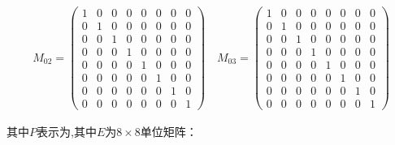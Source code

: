 \documentclass[11pt,a4paper]{article}
\begin{document}
\begin{eqnarray*}
  M_{02} = \left(\begin{array}{rrrrrrrr}
    1 & 0 & 0 & 0 & 0 & 0 & 0 & 0 \\
    0 & 1 & 0 & 0 & 0 & 0 & 0 & 0 \\
    0 & 0 & 1 & 0 & 0 & 0 & 0 & 0 \\
    0 & 0 & 0 & 1 & 0 & 0 & 0 & 0 \\
    0 & 0 & 0 & 0 & 1 & 0 & 0 & 0 \\
    0 & 0 & 0 & 0 & 0 & 1 & 0 & 0 \\
    0 & 0 & 0 & 0 & 0 & 0 & 1 & 0 \\
    0 & 0 & 0 & 0 & 0 & 0 & 0 & 1
    \end{array}\right)\quad
  M_{03} = \left(\begin{array}{rrrrrrrr}
    1 & 0 & 0 & 0 & 0 & 0 & 0 & 0 \\
    0 & 1 & 0 & 0 & 0 & 0 & 0 & 0 \\
    0 & 0 & 1 & 0 & 0 & 0 & 0 & 0 \\
    0 & 0 & 0 & 1 & 0 & 0 & 0 & 0 \\
    0 & 0 & 0 & 0 & 1 & 0 & 0 & 0 \\
    0 & 0 & 0 & 0 & 0 & 1 & 0 & 0 \\
    0 & 0 & 0 & 0 & 0 & 0 & 1 & 0 \\
    0 & 0 & 0 & 0 & 0 & 0 & 0 & 1
    \end{array}\right)
\end{eqnarray*}

其中$P$表示为,其中$E$为$8\times8$单位矩阵：
\end{document}
